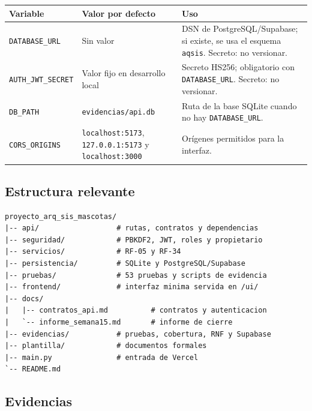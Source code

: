 \documentclass[11pt,a4paper]{article}
\newcommand{\code}[1]{\texttt{#1}}
\newcommand{\thead}[1]{\textbf{#1}}
\begin{document}
{\footnotesize
\begin{tabularx}{\linewidth}{@{}V{0.6}V{1.1}V{1.3}@{}}
\toprule
\thead{Variable} & \thead{Valor por defecto} & \thead{Uso} \\ \midrule
\code{DATABASE\_URL} & Sin valor & DSN de PostgreSQL/Supabase; si existe,
se usa el esquema \code{aqsis}. Secreto: no versionar. \\
\code{AUTH\_JWT\_SECRET} & Valor fijo en desarrollo local & Secreto HS256;
obligatorio con \code{DATABASE\_URL}. Secreto: no versionar. \\
\code{DB\_PATH} & \code{evidencias/api.db} & Ruta de la base SQLite cuando no
hay \code{DATABASE\_URL}. \\
\code{CORS\_ORIGINS} & \code{localhost:5173}, \code{127.0.0.1:5173} y
\code{localhost:3000} & Orígenes permitidos para la interfaz. \\
\bottomrule
\end{tabularx}
}

\subsection{Estructura relevante}

\begin{lstlisting}
proyecto_arq_sis_mascotas/
|-- api/                  # rutas, contratos y dependencias
|-- seguridad/            # PBKDF2, JWT, roles y propietario
|-- servicios/            # RF-05 y RF-34
|-- persistencia/         # SQLite y PostgreSQL/Supabase
|-- pruebas/              # 53 pruebas y scripts de evidencia
|-- frontend/             # interfaz minima servida en /ui/
|-- docs/
|   |-- contratos_api.md          # contratos y autenticacion
|   `-- informe_semana15.md       # informe de cierre
|-- evidencias/           # pruebas, cobertura, RNF y Supabase
|-- plantilla/            # documentos formales
|-- main.py               # entrada de Vercel
`-- README.md
\end{lstlisting}

\subsection{Evidencias}
\end{document}
